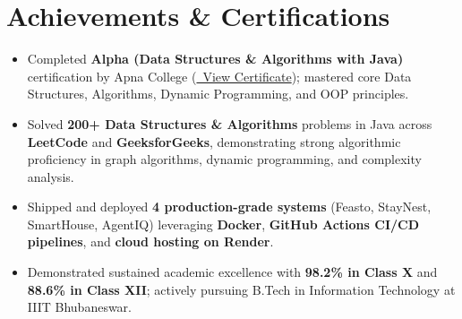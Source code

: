 \documentclass[letterpaper,10pt]{article}
\begin{document}
\section{Achievements \& Certifications}
\vspace{1pt}
\begin{itemize}
    \item \small Completed \textbf{Alpha (Data Structures \& Algorithms with Java)} certification by Apna College (\href{https://github.com/AyushKumar-12345/AyushKumar-12345/blob/main/Sigma_10_DSA_Java_Certificate.pdf}{\faExternalLink*\ View Certificate}); mastered core Data Structures, Algorithms, Dynamic Programming, and OOP principles.
    \item \small Solved \textbf{200+ Data Structures \& Algorithms} problems in Java across \textbf{LeetCode} and \textbf{GeeksforGeeks}, demonstrating strong algorithmic proficiency in graph algorithms, dynamic programming, and complexity analysis.
    \item \small Shipped and deployed \textbf{4 production-grade systems} (Feasto, StayNest, SmartHouse, AgentIQ) leveraging \textbf{Docker}, \textbf{GitHub Actions CI/CD pipelines}, and \textbf{cloud hosting on Render}.
    \item \small Demonstrated sustained academic excellence with \textbf{98.2\% in Class X} and \textbf{88.6\% in Class XII}; actively pursuing B.Tech in Information Technology at IIIT Bhubaneswar.
\end{itemize}
\end{document}
